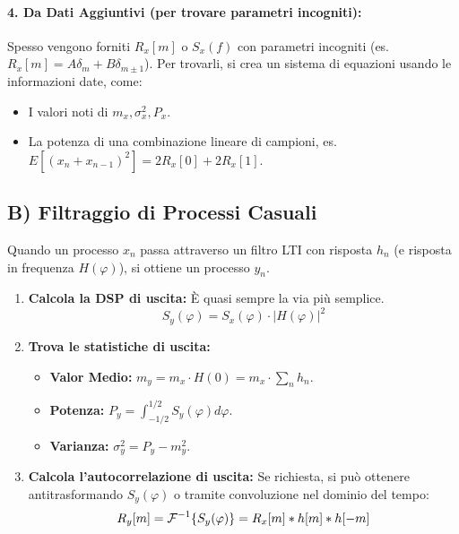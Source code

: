 \paragraph{4. Da Dati Aggiuntivi (per trovare parametri incogniti):}
Spesso vengono forniti $R_x[m]$ o $S_x(f)$ con parametri incogniti (es. $R_x[m] = A\delta_m + B\delta_{m\pm1}$). Per trovarli, si crea un sistema di equazioni usando le informazioni date, come:
\begin{itemize}
    \item I valori noti di $m_x, \sigma_x^2, P_x$.
    \item La potenza di una combinazione lineare di campioni, es. $E[(x_n+x_{n-1})^2] = 2R_x[0] + 2R_x[1]$.
\end{itemize}

\subsection{B) Filtraggio di Processi Casuali}
Quando un processo $x_n$ passa attraverso un filtro LTI con risposta $h_n$ (e risposta in frequenza $H(\varphi)$), si ottiene un processo $y_n$.

\begin{enumerate}
    \item \textbf{Calcola la DSP di uscita:} È quasi sempre la via più semplice.
    $$ S_y(\varphi) = S_x(\varphi) \cdot |H(\varphi)|^2 $$
    \item \textbf{Trova le statistiche di uscita:}
    \begin{itemize}
        \item \textbf{Valor Medio:} $m_y = m_x \cdot H(0) = m_x \cdot \sum_n h_n$.
        \item \textbf{Potenza:} $P_y = \int_{-1/2}^{1/2} S_y(\varphi) d\varphi$.
        \item \textbf{Varianza:} $\sigma_y^2 = P_y - m_y^2$.
    \end{itemize}
    \item \textbf{Calcola l'autocorrelazione di uscita:} Se richiesta, si può ottenere antitrasformando $S_y(\varphi)$ o tramite convoluzione nel dominio del tempo:
    $$ R_y[m] = \mathcal{F}^{-1}\{S_y(\varphi)\} = R_x[m] * h[m] * h[-m] $$
\end{enumerate}

